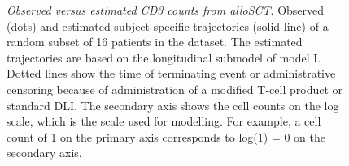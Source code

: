 \documentclass[
  letterpaper,
  paper=240mm:170mm,
  twoside=true,
  open=right,
  fontsize=10pt,
  pagesize=false,
  BCOR=15mm,
  DIV=14,
  headinclude=true,
  footinclude=false,
  headsepline=on]{scrbook}
\begin{document}
\begin{figure}


\caption{\label{fig-DLI-two}\emph{Observed versus estimated CD3 counts
from alloSCT}. Observed (dots) and estimated subject-specific
trajectories (solid line) of a random subset of 16 patients in the
dataset. The estimated trajectories are based on the longitudinal
submodel of model I. Dotted lines show the time of terminating event or
administrative censoring because of administration of a modified T-cell
product or standard DLI. The secondary axis shows the cell counts on the
log scale, which is the scale used for modelling. For example, a cell
count of 1 on the primary axis corresponds to log(1) = 0 on the
secondary axis.}

\end{figure}%
\end{document}
